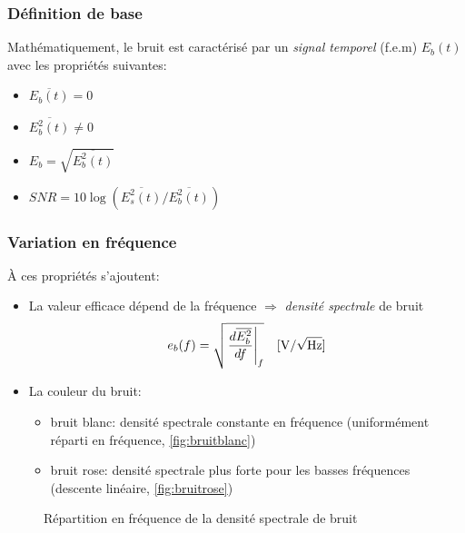 \subsubsection{Définition de base}
Mathématiquement, le bruit est caractérisé par un \emph{signal temporel} (f.e.m) \(E_b(t)\) avec les propriétés suivantes:
\begin{itemize}
	\item { \(\overline{E_b(t)}=0\)}
	\item { \(\overline{E_b^2(t)} \neq 0\)}
	\item { \(E_b=\sqrt{\overline{E_b^2(t)}}\)}
	\item { \(SNR=10\log\left(\overline{E^2_s(t)}/\overline{E_b^2(t)}\right)\)}
\end{itemize}
\subsubsection{Variation en fréquence}
À ces propriétés s'ajoutent:\begin{itemize}
	\item La valeur efficace dépend de la fréquence \(\Rightarrow\) \emph{densité spectrale} de bruit \[e_b(f)=\sqrt{\left.\frac{d\overline{E_b^2}}{df}\right|_f}\quad [\si[per-mode=symbol]{\volt\per\sqrt{\hertz}}]\]
	\item La couleur du bruit:
	\begin{itemize}
		\item bruit blanc: densité spectrale constante en fréquence (uniformément réparti en fréquence, \autoref{fig:bruitblanc})
		\item bruit rose: densité spectrale plus forte pour les basses fréquences (descente linéaire, \autoref{fig:bruitrose})
	\end{itemize}
\end{itemize}
\begin{figure}[H]
	\centering
	\caption{Répartition en fréquence de la densité spectrale de bruit}
\end{figure}
